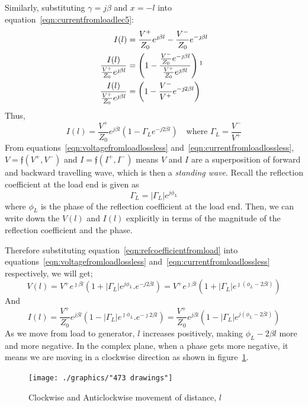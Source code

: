 Similarly, substituting $\gamma = j\beta$ and $x = -l$ into equation~\eqref{eqn:currentfromloadlec5}:
\begin{align*}
I(l) &= \frac{V^+}{Z_0} e^{\jmath \beta l} - \frac{V^-}{Z_0} e^{-\jmath\beta l}\\
\frac{I(l)}{\frac{V^+}{Z_0} e^{\jmath\beta l}} &= \left( 1- \frac{\frac{V^-}{Z_0} e^{-\jmath\beta l}}{\frac{V^+}{Z_0} e^{\jmath\beta l}}\right)\footnotemark\\
\frac{I(l)}{\frac{V^+}{Z_0} e^{\jmath\beta l}} &= \left(1- \frac{V^-}{V^+}e^{-\jmath 2 \beta l}\right)
\end{align*}
Thus,
\begin{equation}
I(l) = \frac{V^+}{Z_0}e ^{j \beta l} \left( 1 - \Gamma_L e^{-j 2 \beta l}\right)\quad\text{where }\Gamma _L = \frac{V^-}{V^+}
\label{eqn:currentfromloadlossless}
\end{equation}
From equations~\eqref{eqn:voltagefromloadlossless} and~\eqref{eqn:currentfromloadlossless}, $V = \mathfrak{f}( V^{+}, V^{-})$ and $I = \mathfrak{f}(I^{+}, I^{-})$ means $V$ and $I$ are a superposition of forward and backward travelling wave, which is then a \emph{standing wave}. Recall the reflection coefficient at the load end is given as
\begin{equation}
\Gamma_L = |\Gamma_L|e^{j\phi_L}
\label{eqn:refcoefficientfromload}
\end{equation}
where $\phi_L$ is the phase of the reflection coefficient at the load end. Then, we can write down the $V(l)$ and $I(l)$ explicitly in terms of the magnitude of the reflection coefficient and the phase.

Therefore substituting equation~\eqref{eqn:refcoefficientfromload} into equations~\eqref{eqn:voltagefromloadlossless} and~\eqref{eqn:currentfromloadlossless} respectively, we will get;
\begin{dmath}
V(l) = V^{+}e^{\jmath\beta l}(1 + |\Gamma_L|e^{j\phi_L} . e^{-j 2 \beta l})
= V^{+}e^{\jmath\beta l}(1 + |\Gamma_L| e^{\jmath(\phi_L -2 \beta l)})
\end{dmath}
And
\begin{dmath}
I(l) = \frac{V^+}{Z_0}e ^{j \beta l}( 1 - |\Gamma_L|e^{\jmath\phi_L} . e^{-\jmath 2\beta l})
= \frac{V^+}{Z_0}e ^{j \beta l}( 1 -|\Gamma_L| e^{j(\phi_L -2 \beta l)})
\end{dmath}
As we move from load to generator, $l$ increases positively, making $\phi_L -2\beta l$ more and more negative. In the complex plane, when a phase gets more negative, it means we are moving in a clockwise direction as shown in figure~\ref{fig:473-drawings}.
\begin{figure}[h]
\centering
\texttt{[image: ./graphics/"473 drawings"]}
\caption{Clockwise and Anticlockwise movement of distance, $l$}
\label{fig:473-drawings}
\end{figure}

